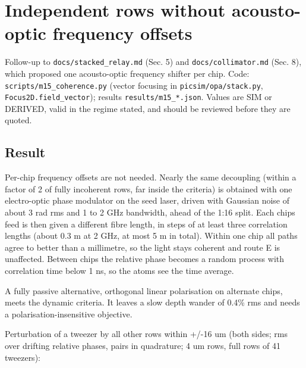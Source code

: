 \hypertarget{independent-rows-without-acousto-optic-frequency-offsets}{%
\chapter{Independent rows without acousto-optic frequency
offsets}\label{row_coherence-independent-rows-without-acousto-optic-frequency-offsets}}

Follow-up to \texttt{docs/stacked\_relay.md} (Sec. 5) and
\texttt{docs/collimator.md} (Sec. 8), which proposed one acousto-optic
frequency shifter per chip. Code: \texttt{scripts/m15\_coherence.py}
(vector focusing in \texttt{picsim/opa/stack.py},
\texttt{Focus2D.field\_vector}); results \texttt{results/m15\_*.json}.
Values are SIM or DERIVED, valid in the regime stated, and should be
reviewed before they are quoted.

\hypertarget{1-result}{%
\section{Result}\label{row_coherence-1-result}}

Per-chip frequency offsets are not needed. Nearly the same decoupling
(within a factor of 2 of fully incoherent rows, far inside the criteria)
is obtained with one electro-optic phase modulator on the seed laser,
driven with Gaussian noise of about 3 rad rms and 1 to 2 GHz bandwidth,
ahead of the 1:16 split. Each chip\textquotesingle s feed is then given
a different fibre length, in steps of at least three correlation lengths
(about 0.3 m at 2 GHz, at most 5 m in total). Within one chip all paths
agree to better than a millimetre, so the light stays coherent and route
E is unaffected. Between chips the relative phase becomes a random
process with correlation time below 1 ns, so the atoms see the time
average.

A fully passive alternative, orthogonal linear polarisation on alternate
chips, meets the dynamic criteria. It leaves a slow depth wander of
0.4\% rms and needs a polarisation-insensitive objective.

Perturbation of a tweezer by all other rows within +/-16 um (both sides;
rms over drifting relative phases, pairs in quadrature; 4 um rows, full
rows of 41 tweezers):

